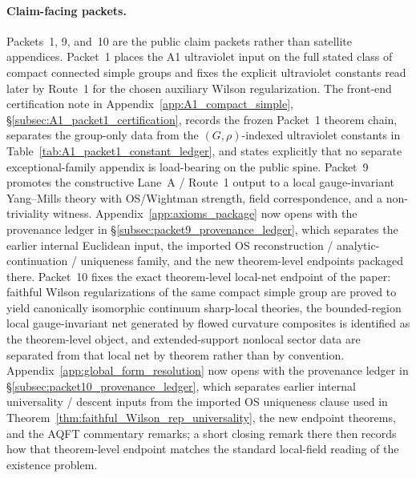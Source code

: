 \paragraph{Claim-facing packets.}
Packets~1, 9, and~10 are the public claim packets rather than satellite appendices.
Packet~1 places the A1 ultraviolet input on the full stated class of compact connected simple groups and fixes the explicit ultraviolet constants read later by Route~1 for the chosen auxiliary Wilson regularization.
The front-end certification note in Appendix~\ref{app:A1_compact_simple}, \S\ref{subsec:A1_packet1_certification}, records the frozen Packet~1 theorem chain, separates the group-only data from the $(G,\rho)$-indexed ultraviolet constants in Table~\ref{tab:A1_packet1_constant_ledger}, and states explicitly that no separate exceptional-family appendix is load-bearing on the public spine.
Packet~9 promotes the constructive Lane~A / Route~1 output to a local gauge-invariant Yang--Mills theory with OS/Wightman strength, field correspondence, and a non-triviality witness. Appendix~\ref{app:axioms_package} now opens with the provenance ledger in \S\ref{subsec:packet9_provenance_ledger}, which separates the earlier internal Euclidean input, the imported OS reconstruction / analytic-continuation / uniqueness family, and the new theorem-level endpoints packaged there.
Packet~10 fixes the exact theorem-level local-net endpoint of the paper: faithful Wilson regularizations of the same compact simple group are proved to yield canonically isomorphic continuum sharp-local theories, the bounded-region local gauge-invariant net generated by flowed curvature composites is identified as the theorem-level object, and extended-support nonlocal sector data are separated from that local net by theorem rather than by convention. Appendix~\ref{app:global_form_resolution} now opens with the provenance ledger in \S\ref{subsec:packet10_provenance_ledger}, which separates earlier internal universality / descent inputs from the imported OS uniqueness clause used in Theorem~\ref{thm:faithful_Wilson_rep_universality}, the new endpoint theorems, and the AQFT commentary remarks; a short closing remark there then records how that theorem-level endpoint matches the standard local-field reading of the existence problem.

